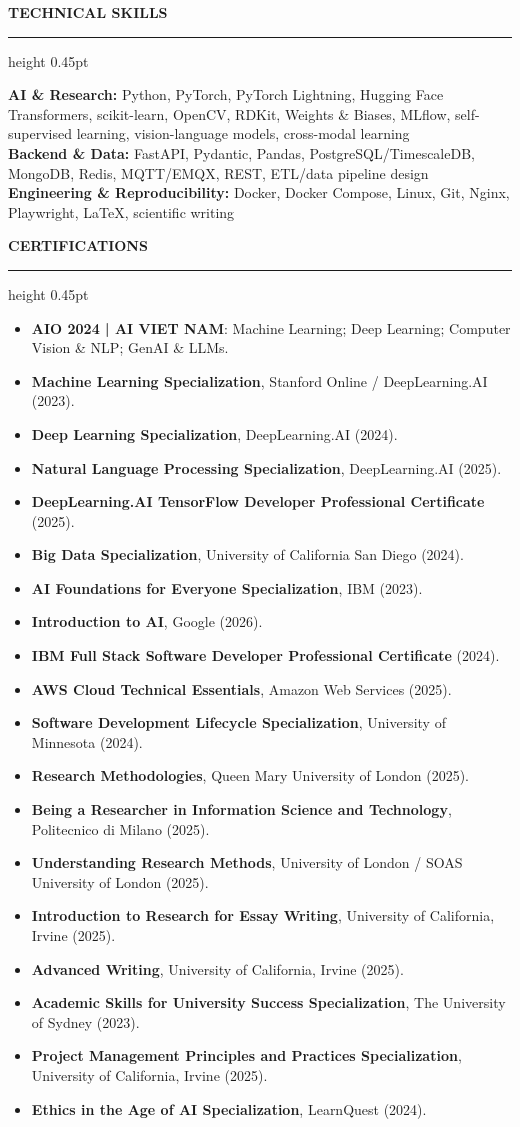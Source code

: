 \documentclass[10pt]{article}
\newcommand{\cvsection}[1]{%
    \vspace{6.2pt}%
    {\color{accent}\bfseries\small #1}\par
    \vspace{2.3pt}%
    {\color{rulegray}\hrule height 0.45pt}\vspace{4.0pt}%
}
\begin{document}
\cvsection{TECHNICAL SKILLS}
{\small
\textbf{AI \& Research:} Python, PyTorch, PyTorch Lightning, Hugging Face Transformers, scikit-learn, OpenCV, RDKit, Weights \& Biases, MLflow, self-supervised learning, vision-language models, cross-modal learning\\
\textbf{Backend \& Data:} FastAPI, Pydantic, Pandas, PostgreSQL/TimescaleDB, MongoDB, Redis, MQTT/EMQX, REST, ETL/data pipeline design\\
\textbf{Engineering \& Reproducibility:} Docker, Docker Compose, Linux, Git, Nginx, Playwright, LaTeX, scientific writing
}

\cvsection{CERTIFICATIONS}
\begin{itemize}
    \item \textbf{AIO 2024 | AI VIET NAM}: Machine Learning; Deep Learning; Computer Vision \& NLP; GenAI \& LLMs.
    \item \textbf{Machine Learning Specialization}, Stanford Online / DeepLearning.AI (2023).
    \item \textbf{Deep Learning Specialization}, DeepLearning.AI (2024).
    \item \textbf{Natural Language Processing Specialization}, DeepLearning.AI (2025).
    \item \textbf{DeepLearning.AI TensorFlow Developer Professional Certificate} (2025).
    \item \textbf{Big Data Specialization}, University of California San Diego (2024).
    \item \textbf{AI Foundations for Everyone Specialization}, IBM (2023).
    \item \textbf{Introduction to AI}, Google (2026).
    \item \textbf{IBM Full Stack Software Developer Professional Certificate} (2024).
    \item \textbf{AWS Cloud Technical Essentials}, Amazon Web Services (2025).
    \item \textbf{Software Development Lifecycle Specialization}, University of Minnesota (2024).
    \item \textbf{Research Methodologies}, Queen Mary University of London (2025).
    \item \textbf{Being a Researcher in Information Science and Technology}, Politecnico di Milano (2025).
    \item \textbf{Understanding Research Methods}, University of London / SOAS University of London (2025).
    \item \textbf{Introduction to Research for Essay Writing}, University of California, Irvine (2025).
    \item \textbf{Advanced Writing}, University of California, Irvine (2025).
    \item \textbf{Academic Skills for University Success Specialization}, The University of Sydney (2023).
    \item \textbf{Project Management Principles and Practices Specialization}, University of California, Irvine (2025).
    \item \textbf{Ethics in the Age of AI Specialization}, LearnQuest (2024).
\end{itemize}
\end{document}
